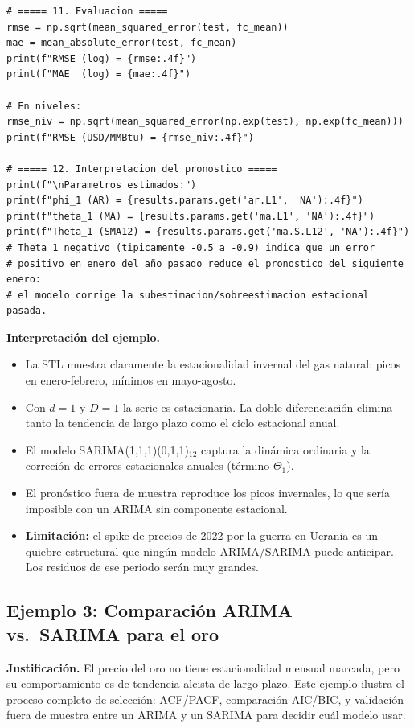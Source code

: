 \documentclass[12pt,a4paper]{article}
\theoremstyle{definition}
\begin{document}
\begin{lstlisting}[style=python, caption={Ejemplo 2: SARIMA para log-precios del gas natural}]
# ===== 11. Evaluacion =====
rmse = np.sqrt(mean_squared_error(test, fc_mean))
mae = mean_absolute_error(test, fc_mean)
print(f"RMSE (log) = {rmse:.4f}")
print(f"MAE  (log) = {mae:.4f}")

# En niveles:
rmse_niv = np.sqrt(mean_squared_error(np.exp(test), np.exp(fc_mean)))
print(f"RMSE (USD/MMBtu) = {rmse_niv:.4f}")

# ===== 12. Interpretacion del pronostico =====
print(f"\nParametros estimados:")
print(f"phi_1 (AR) = {results.params.get('ar.L1', 'NA'):.4f}")
print(f"theta_1 (MA) = {results.params.get('ma.L1', 'NA'):.4f}")
print(f"Theta_1 (SMA12) = {results.params.get('ma.S.L12', 'NA'):.4f}")
# Theta_1 negativo (tipicamente -0.5 a -0.9) indica que un error
# positivo en enero del año pasado reduce el pronostico del siguiente enero:
# el modelo corrige la subestimacion/sobreestimacion estacional pasada.
\end{lstlisting}

\noindent\textbf{Interpretación del ejemplo.}
\begin{itemize}[nosep]
  \item La STL muestra claramente la estacionalidad invernal del gas natural:
        picos en enero-febrero, mínimos en mayo-agosto.
  \item Con $d=1$ y $D=1$ la serie es estacionaria. La doble diferenciación
        elimina tanto la tendencia de largo plazo como el ciclo estacional anual.
  \item El modelo SARIMA(1,1,1)(0,1,1)$_{12}$ captura la dinámica ordinaria y
        la correción de errores estacionales anuales (término $\Theta_1$).
  \item El pronóstico fuera de muestra reproduce los picos invernales, lo que
        sería imposible con un ARIMA sin componente estacional.
  \item \textbf{Limitación:} el spike de precios de 2022 por la guerra en
        Ucrania es un quiebre estructural que ningún modelo ARIMA/SARIMA puede
        anticipar. Los residuos de ese periodo serán muy grandes.
\end{itemize}

\subsection{Ejemplo 3: Comparación ARIMA vs.\ SARIMA para el oro}

\noindent\textbf{Justificación.} El precio del oro no tiene estacionalidad
mensual marcada, pero su comportamiento es de tendencia alcista de largo plazo.
Este ejemplo ilustra el proceso completo de selección: ACF/PACF, comparación
AIC/BIC, y validación fuera de muestra entre un ARIMA y un SARIMA para
decidir cuál modelo usar.
\end{document}
